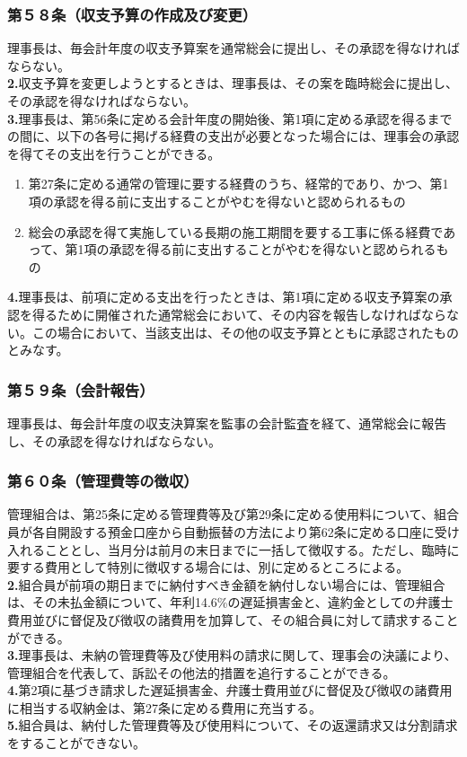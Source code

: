 \documentclass[12pt,uplatex]{jsarticle}
\begin{document}
\subsubsection*{第５８条（収支予算の作成及び変更）}
理事長は、毎会計年度の収支予算案を通常総会に提出し、その承認を得なければならない。\\
\textbf{2.}収支予算を変更しようとするときは、理事長は、その案を臨時総会に提出し、その承認を得なければならない。\\
\textbf{3.}理事長は、第56条に定める会計年度の開始後、第1項に定める承認を得るまでの間に、以下の各号に掲げる経費の支出が必要となった場合には、理事会の承認を得てその支出を行うことができる。
\begin{enumerate}
\item 第27条に定める通常の管理に要する経費のうち、経常的であり、かつ、第1項の承認を得る前に支出することがやむを得ないと認められるもの
\item 総会の承認を得て実施している長期の施工期間を要する工事に係る経費であって、第1項の承認を得る前に支出することがやむを得ないと認められるもの
\end{enumerate}
\textbf{4.}理事長は、前項に定める支出を行ったときは、第1項に定める収支予算案の承認を得るために開催された通常総会において、その内容を報告しなければならない。この場合において、当該支出は、その他の収支予算とともに承認されたものとみなす。
\subsubsection*{第５９条（会計報告）}
理事長は、毎会計年度の収支決算案を監事の会計監査を経て、通常総会に報告し、その承認を得なければならない。
\subsubsection*{第６０条（管理費等の徴収）}
管理組合は、第25条に定める管理費等及び第29条に定める使用料について、組合員が各自開設する預金口座から自動振替の方法により第62条に定める口座に受け入れることとし、当月分は前月の末日までに一括して徴収する。ただし、臨時に要する費用として特別に徴収する場合には、別に定めるところによる。\\
\textbf{2.}組合員が前項の期日までに納付すべき金額を納付しない場合には、管理組合は、その未払金額について、年利14.6\%の遅延損害金と、違約金としての弁護士費用並びに督促及び徴収の諸費用を加算して、その組合員に対して請求することができる。\\
\textbf{3.}理事長は、未納の管理費等及び使用料の請求に関して、理事会の決議により、管理組合を代表して、訴訟その他法的措置を追行することができる。\\
\textbf{4.}第2項に基づき請求した遅延損害金、弁護士費用並びに督促及び徴収の諸費用に相当する収納金は、第27条に定める費用に充当する。\\
\textbf{5.}組合員は、納付した管理費等及び使用料について、その返還請求又は分割請求をすることができない。
\end{document}
